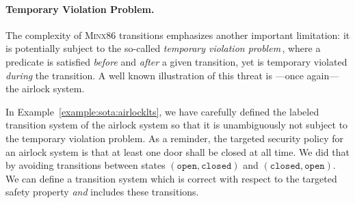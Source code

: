 \paragraph{Temporary Violation Problem.}
%
The complexity of {\scshape Minx86} transitions emphasizes another important
limitation: it is potentially subject to the so-called \emph{temporary violation
  problem}\,\cite{muller2006tempviolation}, where a predicate is satisfied
\emph{before} and \emph{after} a given transition, yet is temporary violated
\emph{during} the transition.
%
A well known illustration of this threat is ---once again--- the airlock system.

\begin{example}
  In Example~\ref{example:sota:airlocklts}, we have carefully defined the
  labeled transition system of the airlock system so that it is unambiguously
  not subject to the temporary violation problem.
  As a reminder, the targeted security policy for an airlock system is that at
  least one door shall be closed at all time.
  We did that by avoiding transitions between states
  \( (\mathtt{open}, \mathtt{closed}) \) and
  \( (\mathtt{closed}, \mathtt{open}) \).
  We can define a transition system which is correct with respect to the
  targeted safety property \emph{and} includes these transitions.

  \begin{center}
  \end{center}


\end{example}
